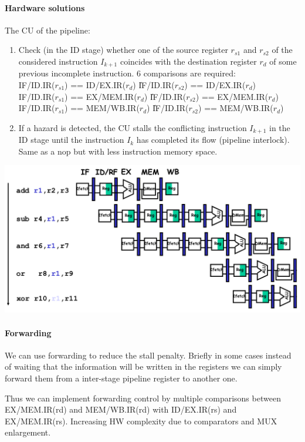 \paragraph{Hardware solutions}
The CU of the pipeline:
\begin{enumerate}
    \item Check (in the ID stage) whether one of the source register $r_{s1}$ and $r_{s2}$ of the considered instruction $I_{k+1}$ coincides with the destination register $r_d$ of some previous incomplete instruction. 6 comparisons are required:\\
    IF/ID.IR($r_{s1}$) == ID/EX.IR($r_d$) \|  IF/ID.IR($r_{s2}$) == ID/EX.IR($r_d$)\\
    IF/ID.IR($r_{s1}$) == EX/MEM.IR($r_d$) \|  IF/ID.IR($r_{s2}$) == EX/MEM.IR($r_d$)\\
    IF/ID.IR($r_{s1}$) == MEM/WB.IR($r_d$) \|  IF/ID.IR($r_{s2}$) == MEM/WB.IR($r_d$)
    
    \item If a hazard is detected, the CU stalls the conflicting instruction $I_{k+1}$ in the ID stage until the instruction $I_k$ has completed its flow (pipeline interlock). Same as a nop but with less instruction memory space.
\end{enumerate}
\includegraphics[width=\textwidth]{images/pipeline_CU_scheme.png}

\paragraph{Forwarding}
We can use forwarding to reduce the stall penalty. Briefly in some cases instead of waiting that the information will be written in the registers we can simply forward them from a inter-stage pipeline register to another one.

Thus we can implement forwarding control by multiple comparisons between EX/MEM.IR(rd) and MEM/WB.IR(rd) with ID/EX.IR(rs) and EX/MEM.IR(rs). Increasing HW complexity due to comparators and MUX enlargement.

